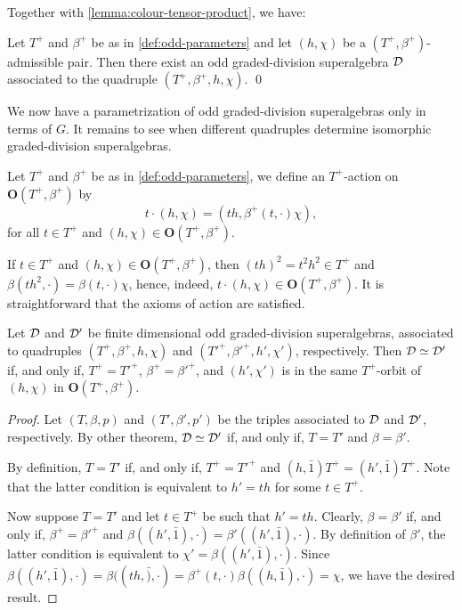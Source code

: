 Together with \cref{lemma:colour-tensor-product}, we have:

\begin{prop}
    Let $T^+$ and $\beta^+$ be as in \cref{def:odd-parameters} and let $(h, \chi)$ be a $(T^+, \beta^+)$-admissible pair. 
    Then there exist an odd graded-division superalgebra $\mathcal{D}$ associated to the quadruple $(T^+, \beta^+, h,\chi)$. \qed
\end{prop}

We now have a parametrization of odd graded-division superalgebras only in terms of $G$. 
It remains to see when different quadruples determine isomorphic graded-division superalgebras. 

\begin{defi}\label{def:T^+-action}
    Let $T^+$ and $\beta^+$ be as in \cref{def:odd-parameters}, we define an $T^+$-action on $\mathbf{O} (T^+, \beta^+)$ by
    \[
        t \cdot (h, \chi) = (th, \beta^+(t, \cdot) \chi),
    \]
    for all $t\in T^+$ and $(h, \chi) \in \mathbf{O} (T^+, \beta^+)$.
\end{defi}

If $t\in T^+$ and $(h, \chi) \in \mathbf {O} (T^+, \beta^+)$, then $(th)^2 = t^2h^2\in T^+$ and $\beta(th^2, \cdot) = \beta(t, \cdot) \chi$, hence, indeed, $t \cdot (h, \chi) \in \mathbf {O} (T^+, \beta^+)$. 
It is straightforward that the axioms of action are satisfied. 

\begin{thm}
    Let $\mathcal{D}$ and $\mathcal{D}'$ be finite dimensional odd graded-division superalgebras, associated to quadruples $(T^+, \beta^+, h, \chi)$ and $(T'^+, \beta'^+, h', \chi')$, respectively. 
    Then $\mathcal{D} \simeq \mathcal{D}'$ if, and only if, $T^+ = T'^+$, $\beta^+ = \beta'^+$, and $(h', \chi')$ is in the same $T^+$-orbit of $(h, \chi)$ in $\mathbf {O} (T^+, \beta^+)$. 
\end{thm}

\begin{proof}
    Let $(T, \beta, p)$ and $(T', \beta', p')$ be the triples associated to $\mathcal{D}$ and $\mathcal{D}'$, respectively. 
    By other theorem, $\mathcal{D} \simeq \mathcal{D}'$ if, and only if, $T= T'$ and $\beta = \beta'$. 
    
    By definition, $T= T'$ if, and only if, $T^+ = T'^+$ and $(h, \bar 1)T^+ = (h', \bar 1)T^+$. 
    Note that the latter condition is equivalent to 
    $h' = th$ for some $t\in T^+$. 
    
    Now suppose $T= T'$ and let $t\in T^+$ be such that $h' = th$. 
    Clearly, $\beta = \beta'$ if, and only if, 
    $\beta^+ = \beta'^+$ and $\beta((h', \bar 1), \cdot) = \beta'((h', \bar 1), \cdot)$. 
    By definition of $\beta'$, the latter condition is equivalent to $\chi' = \beta((h', \bar 1), \cdot)$. 
    Since $\beta((h', \bar 1), \cdot) = \beta ((th, \bar), \cdot) = \beta^+ (t, \cdot) \beta ((h, \bar 1), \cdot) = \chi$, we have the desired result. 
\end{proof}

